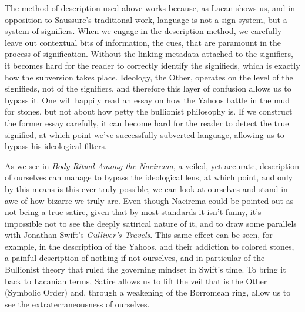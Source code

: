 \documentclass[11pt,letterpaper]{article}
\theoremstyle{definition}
\begin{document}
The method of description used above works because, as Lacan shows us, and in opposition to Saussure's traditional work, language is not a sign-system, but a system of signifiers. When  we engage in the description method, we carefully leave out contextual bits of information, the cues, that are paramount in the process of signification. Without the linking metadata attached to the signifiers, it becomes hard for the reader to correctly identify the signifieds, which is exactly how the subversion takes place. Ideology, the Other, operates on the level of the signifieds, not of the signifiers, and therefore this layer of confusion allows us to bypass it. One will happily read an essay on how the Yahoos battle in the mud for stones, but not about how petty the bullionist philosophy is. If we construct the former essay carefully, it can become hard for the reader to detect the true signified, at which point we've successfully subverted language, allowing us to bypass his ideological filters.

As we see in \textit{Body Ritual Among the Nacirema},\autocite{miner_1956} a veiled, yet accurate, description of ourselves can manage to bypass the ideological lens, at which point, and only by this means is this ever truly possible, we can look at ourselves and stand in awe of how bizarre we truly are. Even though Nacirema could be pointed out as not being a true satire, given that by most standards it isn't funny, it's impossible not to see the deeply satirical nature of it, and to draw some parallels with Jonathan Swift's \textit{Gulliver's Travels}. This same effect can be seen, for example, in the description of the Yahoos, and their addiction to colored stones,\autocite{swift_rivero_2002} a painful description of nothing if not ourselves, and in particular of the Bullionist theory that ruled the governing mindset in Swift's time. To bring it back to Lacanian terms, Satire allows us to lift the veil that is the Other (Symbolic Order) and, through a weakening of the Borromean ring, allow us to see the extraterraneousness of ourselves.
\end{document}
